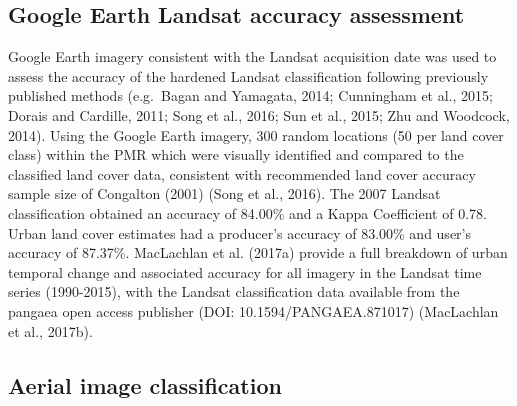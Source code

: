 \documentclass[]{book}
\begin{document}
\subsection{Google Earth Landsat accuracy
assessment}\label{google-earth-landsat-accuracy-assessment}

Google Earth imagery consistent with the Landsat acquisition date was
used to assess the accuracy of the hardened Landsat classification
following previously published methods (e.g.~Bagan and Yamagata, 2014;
Cunningham et al., 2015; Dorais and Cardille, 2011; Song et al., 2016;
Sun et al., 2015; Zhu and Woodcock, 2014). Using the Google Earth
imagery, 300 random locations (50 per land cover class) within the PMR
which were visually identified and compared to the classified land cover
data, consistent with recommended land cover accuracy sample size of
Congalton (2001) (Song et al., 2016). The 2007 Landsat classification
obtained an accuracy of 84.00\% and a Kappa Coefficient of 0.78. Urban
land cover estimates had a producer's accuracy of 83.00\% and user's
accuracy of 87.37\%. MacLachlan et al. (2017a) provide a full breakdown
of urban temporal change and associated accuracy for all imagery in the
Landsat time series (1990-2015), with the Landsat classification data
available from the pangaea open access publisher (DOI:
10.1594/PANGAEA.871017) (MacLachlan et al., 2017b).

\subsection{Aerial image
classification}\label{aerial-image-classification}
\end{document}
